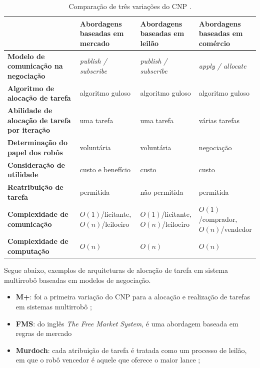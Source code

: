                 \begin{table}[hbt]
                    \setlength\extrarowheight{4pt}
                    \centering
                    \caption[Comparação de três variações do CNP.]{Comparação de três variações do CNP \cite{ref:yan2013survey}.}
                    \label{tab:arquiteturas_cnp}
                    \begin{tabular}{>{\centering\bfseries}m{} >{\centering}m{} >{\centering}m{} >{\centering\arraybackslash}m{}}
                        \toprule
                         & \textbf{Abordagens baseadas em mercado} & \textbf{Abordagens baseadas em leilão} & \textbf{Abordagens baseadas em comércio} \\
                        \midrule
                        Modelo de comunicação na negociação & \textit{publish / subscribe} & \textit{publish / subscribe} & \textit{apply / allocate} \\
                        Algoritmo de alocação de tarefa & algoritmo guloso & algoritmo guloso & algoritmo guloso \\
                        Abilidade de alocação de tarefa por iteração & uma tarefa & uma tarefa & várias tarefas \\
                        Determinação do papel dos robôs & voluntária & voluntária & negociação \\
                        Consideração de utilidade & custo e benefício & custo & custo \\
                        Reatribuição de tarefa & permitida & não permitida & permitida \\
                        Complexidade de comunicação & $O(1)$/licitante, $O(n)$/leiloeiro & $O(1)$/licitante, $O(n)$/leiloeiro & $O(1)$/comprador, $O(n)$/vendedor \\
                        Complexidade de computação & $O(n)$ & $O(n)$ & $O(n)$ \\
                        \bottomrule
                    \end{tabular}
                \end{table}
                
                Segue abaixo, exemplos de arquiteturas de alocação de tarefa em sistema multirrobô baseadas em modelos de negociação.
    
                \begin{itemize}
                    \item \textbf{M+}: foi a primeira variação do CNP para a alocação e realização de tarefas em sistemas multirrobô \cite{ref:botelho1999m+};
                    \item \textbf{FMS}: do inglês \textit{The Free Market System}, é uma abordagem baseada em regras de mercado
                    \item \textbf{Murdoch}: cada atribuição de tarefa é tratada como um processo de leilão, em que o robô vencedor é aquele que oferece o maior lance \cite{ref:gerkey2002murdoch};
                \end{itemize}
                
